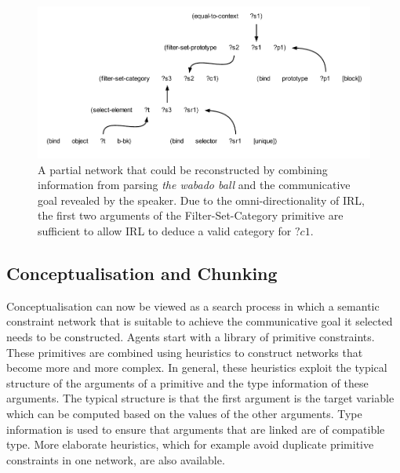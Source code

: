 \begin{figure}[t]
  \begin{center}
    \includegraphics[width=.9\textwidth]{./frameworks/figures/network-learning.pdf}
    \caption[Example constraint network during learning]{A partial
      network that could be reconstructed by combining information
      from parsing \textit{the wabado ball} and the communicative goal
      revealed by the speaker. Due to the omni-directionality of IRL,
      the first two arguments of the {\sc Filter-Set-Category}
      primitive are sufficient to allow IRL to deduce a valid category
      for $?c1$.}
    \label{f:network-learning}
  \end{center}
\end{figure}

\subsection{Conceptualisation and Chunking}
\label{s:irl-conceptualisation}

Conceptualisation can now be viewed as a search process in which a
semantic constraint network that is suitable to achieve the
communicative goal it selected \citep{steels05planning} needs to be
constructed. Agents start with a library of primitive
constraints. These primitives are combined using heuristics to
construct networks that become more and more complex. In general,
these heuristics exploit the typical structure of the arguments of a
primitive and the type information of these arguments. The typical
structure is that the first argument is the target variable which can
be computed based on the values of the other arguments. Type
information is used to ensure that arguments that are linked are of
compatible type. More elaborate heuristics, which for example avoid
duplicate primitive constraints in one network, are also available.

